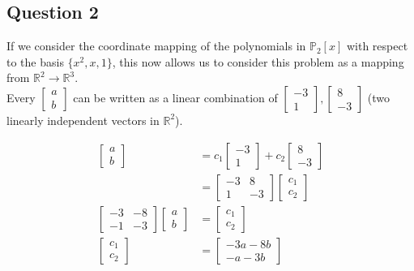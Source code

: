 \documentclass{article}
\begin{document}
\subsection*{Question 2}

If we consider the coordinate mapping of the polynomials in \(\mathbb{P}_2[x]\) with respect to 
the basis \(\{x^2,x,1\}\), this now allows us to consider this problem as a mapping from 
\(\mathbb{R}^2 \rightarrow \mathbb{R}^3\).
\\


Every \(\begin{bmatrix}
     a \\ b
\end{bmatrix}\) can be written as a linear combination of \(\begin{bmatrix}
-3 \\ 1
\end{bmatrix}, \begin{bmatrix}
8 \\ -3
\end{bmatrix}\) (two linearly independent vectors in \(\mathbb{R}^2\)).

\begin{align*}
    \begin{bmatrix}
        a \\ b
    \end{bmatrix} &= 
    c_1 \begin{bmatrix}
        -3 \\ 1
    \end{bmatrix} + c_2 \begin{bmatrix}
        8 \\ -3
    \end{bmatrix} \\
    &= \begin{bmatrix}
        -3 & 8 \\
        1 & -3
    \end{bmatrix} 
    \begin{bmatrix}
        c_1 \\ c_2
    \end{bmatrix} \\
    \begin{bmatrix}
        -3 & -8 \\
        -1 & -3
    \end{bmatrix}
    \begin{bmatrix}
        a \\ b
    \end{bmatrix} &= \begin{bmatrix}
        c_1 \\ c_2
    \end{bmatrix} \\
    \begin{bmatrix}
        c_1 \\ c_2
    \end{bmatrix} &= 
    \begin{bmatrix}
        -3a - 8b \\
        -a -3b
    \end{bmatrix}
\end{align*}
\end{document}
